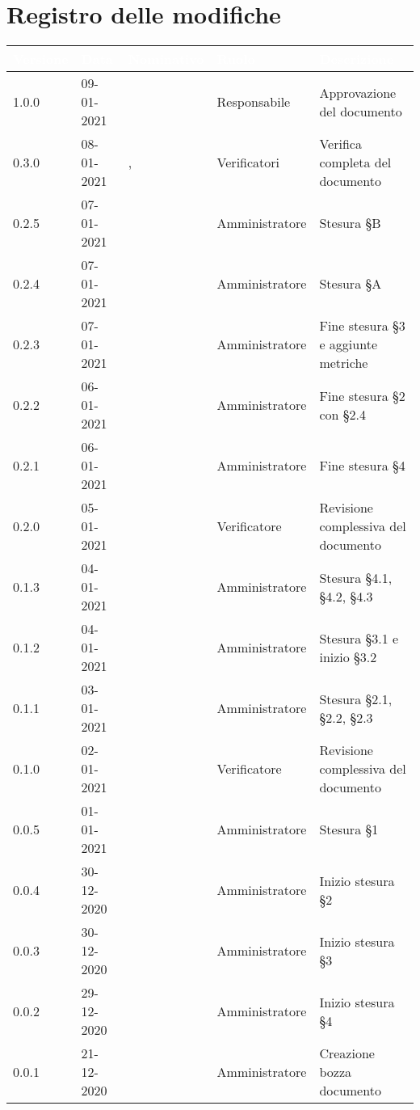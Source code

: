 \section*{Registro delle modifiche}
\setcounter{table}{-1}
{
\renewcommand{\arraystretch}{1.5}
\centering
\begin{longtable}{C{1.7cm} C{2.5cm} C{3.2cm} C{2.7cm} C{4.8cm}}
\textcolor{white}{\textbf{Versione}}&
\textcolor{white}{\textbf{Data}}&
\textcolor{white}{\textbf{Nominativo}}&
\textcolor{white}{\textbf{Ruolo}}&
\textcolor{white}{\textbf{Descrizione}}\\	
\endhead

1.0.0 & 09-01-2021 & \BM{} & Responsabile & Approvazione del documento \\
0.3.0 & 08-01-2021 & \SP{}, \BM{} & Verificatori & Verifica completa del documento \\
0.2.5 & 07-01-2021 & \RA{} & Amministratore & Stesura \S B \\
0.2.4 & 07-01-2021 & \PA{} & Amministratore & Stesura \S A \\
0.2.3 & 07-01-2021 & \ZM{} & Amministratore & Fine stesura \S 3 e aggiunte metriche \\
0.2.2 & 06-01-2021 & \PA{} & Amministratore & Fine stesura \S 2 con \S 2.4   \\
0.2.1 & 06-01-2021 & \RA{} & Amministratore & Fine stesura \S 4\\
0.2.0 & 05-01-2021 & \BM{} & Verificatore & Revisione complessiva del documento \\
0.1.3 & 04-01-2021 & \RA{} & Amministratore & Stesura \S 4.1, \S 4.2, \S 4.3 \\
0.1.2 & 04-01-2021 & \ZM{} & Amministratore & Stesura \S 3.1 e inizio \S 3.2\\
0.1.1 & 03-01-2021 & \PA{} & Amministratore & Stesura \S 2.1, \S 2.2, \S 2.3 \\
0.1.0 & 02-01-2021 & \BM{} & Verificatore & Revisione complessiva del documento \\
0.0.5 & 01-01-2021 & \ZM{} & Amministratore & Stesura \S 1\\
0.0.4 & 30-12-2020 & \PA{} & Amministratore & Inizio stesura \S 2 \\
0.0.3 & 30-12-2020 & \ZM{} & Amministratore & Inizio stesura \S 3\\
0.0.2 & 29-12-2020 & \RA{} & Amministratore & Inizio stesura \S 4 \\
0.0.1 & 21-12-2020 & \ZM{} & Amministratore & Creazione bozza documento \\	
\end{longtable}
}
